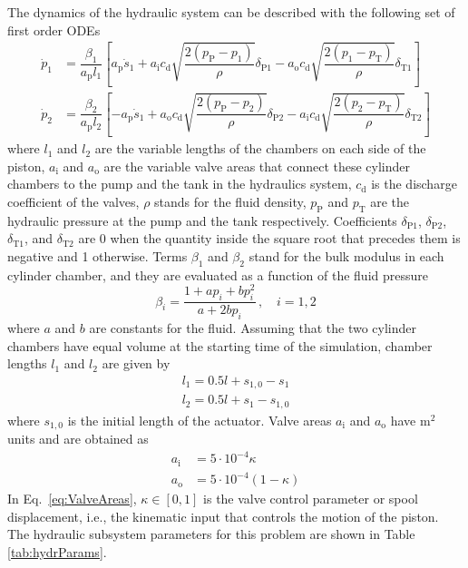 \documentclass[fleqn,11pt]{article}
\newcommand{\plbr}[1]{ \left( #1 \right) }
\newcommand{\sqbr}[1]{ \left[ #1 \right] }
\begin{document}
The dynamics of the hydraulic system can be described with the following set of first order ODEs \cite{Naya2011}
\begin{align}
	\label{eq:hydODE1}
	\dot{p}_1 
	&= 
	\dfrac{\beta_1}{a_\text{p} l_1}
	\sqbr{a_\text{p} \dot{s}_1 
		+ a_{\text{i}} c_{\text{d}} \sqrt{\dfrac{2 \plbr{p_{\text{P}} - p_1}}{\rho}}\delta_{\text{P1}} 
		- a_{\text{o}} c_{\text{d}} \sqrt{\dfrac{2 \plbr{p_1 - p_{\text{T}}}}{\rho}}\delta_{\text{T1}}}
	\\[2mm]
	\dot{p}_2 
	&= 
	\dfrac{\beta_2}{a_\text{p} l_2}
	\sqbr{- a_\text{p} \dot{s}_1 
		+ a_{\text{o}} c_{\text{d}} \sqrt{\dfrac{2 \plbr{p_{\text{P}} - p_2}}{\rho}}\delta_{\text{P2}} 
		- a_{\text{i}} c_{\text{d}} \sqrt{\dfrac{2 \plbr{p_2 - p_{\text{T}}}}{\rho}}\delta_{\text{T2}}}
	\label{eq:hydODE2}
\end{align}
where $l_1$ and $l_2$ are the variable lengths of the chambers on each side of the piston, $a_{\text{i}}$ and $a_{\text{o}}$ are the variable valve areas that connect these cylinder chambers to the pump and the tank in the hydraulics system, $c_{\text{d}}$ is the discharge coefficient of the valves, $\rho$ stands for the fluid density, $p_{\text{P}}$ and $p_{\text{T}}$ are the hydraulic pressure at the pump and the tank respectively. 
Coefficients $\delta_{\text{P1}}$, $\delta_{\text{P2}}$, $\delta_{\text{T1}}$, and $\delta_{\text{T2}}$ are 0 when the quantity inside the square root that precedes them is negative and 1 otherwise.
Terms $\beta_1$ and $\beta_2$ stand for the bulk modulus in each cylinder chamber, and they are evaluated as a function of the fluid pressure \cite{Cardona1990}
\begin{equation}
	\beta_i = \dfrac{1+ap_i+bp_i^2}{a+2bp_i}\,, \quad i=1,2
	\label{eq:bulkModulus}
\end{equation}
where $a$ and $b$ are constants for the fluid.
Assuming that the two cylinder chambers have equal volume at the starting time of the simulation, chamber lengths $l_1$ and $l_2$ are given by
\begin{equation}
	\begin{split}
		l_1 = 0.5 l + s_{1,0} - s_1
		\\
		l_2 = 0.5 l + s_1 - s_{1,0}
	\end{split}
	\label{eq:chamberLengths}
\end{equation}
where $s_{1,0}$ is the initial length of the actuator.
Valve areas $a_{\text{i}}$ and $a_{\text{o}}$ have m$^2$ units and are obtained as
\begin{equation}
	\begin{aligned}
		a_{\text{i}} &= 5 \cdot 10^{-4} \kappa
		\\
		a_{\text{o}} &= 5 \cdot 10^{-4} \plbr{1-\kappa}
	\end{aligned}
	\label{eq:ValveAreas}
\end{equation}
In Eq.~\eqref{eq:ValveAreas}, $\kappa \in \sqbr{0,1}$ is the valve control parameter or spool displacement, i.e., the kinematic input that controls the motion of the piston.
The hydraulic subsystem parameters for this problem are shown in Table \ref{tab:hydrParams}.
\end{document}
